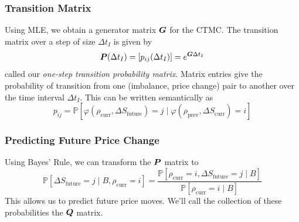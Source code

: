 \begin{frame}
\frametitle{Transition Matrix}
Using MLE, we obtain a generator matrix $\boldsymbol{G}$ for the CTMC. The transition matrix over a step of size $\Delta t_I$ is given by
\[ \boldsymbol{P}(\Delta t_I) = [p_{ij}(\Delta t_I)] = e^{\boldsymbol{G} \Delta t_I} \]
called our \emph{one-step transition probability matrix}. Matrix entries give the probability of transition from one (imbalance, price change) pair to another over the time interval $\Delta t_I$. This can be written semantically as
\[ p_{ij} = \mathbb{P}\left[ \varphi( \rho_\text{curr}, \Delta S_\text{future}) = j \; | \; \varphi( \rho_\text{prev}, \Delta S_\text{curr} ) = i \right] \]
\end{frame}

\begin{frame}
\frametitle{Predicting Future Price Change}
Using Bayes' Rule, we can transform the $\boldsymbol{P}$ matrix to 
\[ \mathbb{P}\left[ \Delta S_\text{future} = j \; | \; B, \rho_\text{curr} = i \right] = \dfrac{\mathbb{P}\left[ \rho_\text{curr} = i, \Delta S_\text{future} = j \; | \; B \right]}{\mathbb{P}\left[ \rho_\text{curr} = i \; | \; B \right]} \]
This allows us to predict future price moves.
\vspace{\baselineskip}
We'll call the collection of these probabilities the $\boldsymbol{Q}$ matrix.
\end{frame}

